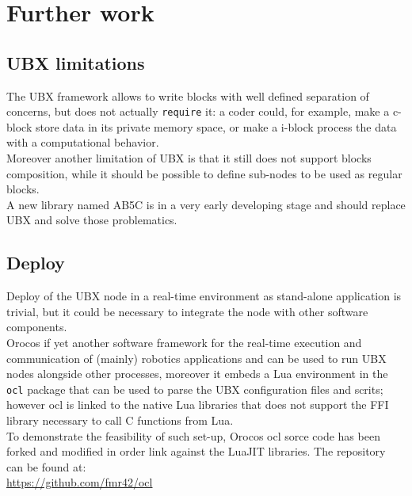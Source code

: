 \chapter{Further work}
\label{ch:further}
\section{UBX limitations}
The UBX framework allows to write blocks with well defined separation of concerns, but does not actually \texttt{require} it: a coder could, for example, make a c-block store data in its private memory space, or make a i-block process the data with a computational behavior.\\
Moreover another limitation of UBX is that it still does not support blocks composition, while it should be possible to define sub-nodes to be used as regular blocks.\\
A new library named AB5C is in a very early developing stage and should replace UBX and solve those problematics.

\section{Deploy}
Deploy of the UBX node in a real-time environment as stand-alone application is trivial, but it could be necessary to integrate the node with other software components.\\
Orocos if yet another software framework for the real-time execution and communication of (mainly) robotics applications and can be used to run UBX nodes alongside other processes, moreover it embeds a Lua environment in the \texttt{ocl} package that can be used to parse the UBX configuration files and scrits; however ocl is linked to the native Lua libraries that does not support the FFI library necessary to call C functions from Lua.\\
To demonstrate the feasibility of such set-up, Orocos ocl sorce code has been forked and modified in order link against the LuaJIT libraries. The repository can be found at:\\
\url{https://github.com/fmr42/ocl}



